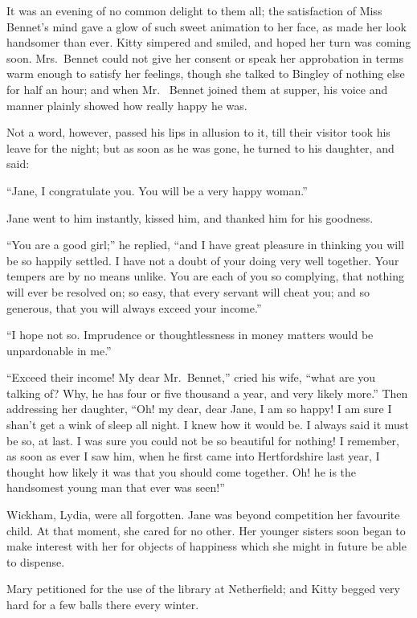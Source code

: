 It was an evening of no common delight to them all; the
satisfaction of Miss Bennet's mind gave a glow of such sweet
animation to her face, as made her look handsomer than ever.
Kitty simpered and smiled, and hoped her turn was coming soon.
Mrs.\ Bennet could not give her consent or speak her approbation
in terms warm enough to satisfy her feelings, though she talked
to Bingley of nothing else for half an hour; and when Mr.\ %
Bennet joined them at supper, his voice and manner plainly
showed how really happy he was.

Not a word, however, passed his lips in allusion to it, till
their visitor took his leave for the night; but as soon as he
was gone, he turned to his daughter, and said:

``Jane, I congratulate you.  You will be a very happy woman.''

Jane went to him instantly, kissed him, and thanked him for his
goodness.

``You are a good girl;'' he replied, ``and I have great pleasure
in thinking you will be so happily settled.  I have not a doubt
of your doing very well together.  Your tempers are by no means
unlike.  You are each of you so complying, that nothing will
ever be resolved on; so easy, that every servant will cheat
you; and so generous, that you will always exceed your income.''

``I hope not so.  Imprudence or thoughtlessness in money matters
would be unpardonable in me.''

``Exceed their income!  My dear Mr.\ Bennet,'' cried his wife,
``what are you talking of?  Why, he has four or five thousand a
year, and very likely more.''  Then addressing her daughter,
``Oh! my dear, dear Jane, I am so happy!  I am sure I shan't
get a wink of sleep all night.  I knew how it would be.  I
always said it must be so, at last.  I was sure you could not
be so beautiful for nothing!  I remember, as soon as ever I saw
him, when he first came into Hertfordshire last year, I thought
how likely it was that you should come together.  Oh! he is
the handsomest young man that ever was seen!''

Wickham, Lydia, were all forgotten.  Jane was beyond competition
her favourite child.  At that moment, she cared for no other.  Her
younger sisters soon began to make interest with her for objects
of happiness which she might in future be able to dispense.

Mary petitioned for the use of the library at Netherfield; and
Kitty begged very hard for a few balls there every winter.


